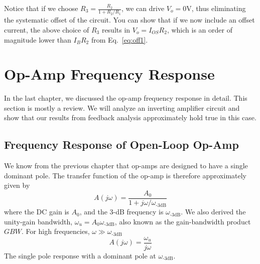 Notice that if we choose $R_3 = \frac{R_2}{1 + R_2/R_1}$, we can drive $V_o = 0$V, thus eliminating the systematic offset of the circuit.  You can show that if we now include an offset current, the above choice of $R_3$ results in $V_o = I_{OS} R_2 $, which is an order of magnitude lower than $I_B R_2$ from Eq.~\ref{eq:off1}.
\section{Op-Amp Frequency Response}
In the last chapter, we discussed the op-amp frequency response in detail. This section is mostly a review.  We will analyze an inverting amplifier circuit and show that our results from feedback analysis approximately hold true in this case.
\subsection{Frequency Response of Open-Loop Op-Amp}
We know from the previous chapter that op-amps are designed to have a single dominant pole.  The transfer function of the op-amp is therefore approximately given by
    \begin{equation} 
        A(j\omega) = \frac{A_0}{1 + j\omega/\omega_\text{-3dB}} 
    \end{equation}
where the DC gain is $A_0$, and the 3-dB frequency is $\omega_{\text{-3dB}}$.  We also derived the unity-gain bandwidth, $\omega_u = A_0 \omega_{\text{-3dB}}$, also known as the  gain-bandwidth product $GBW$.  For high frequencies, $\omega \gg \omega_{\text{-3dB}}$
    \begin{equation}
        A(j\omega) = \frac{\omega_u}{j\omega}
    \end{equation}
The single pole response with a dominant pole at $\omega_{\text{-3dB}}$.
